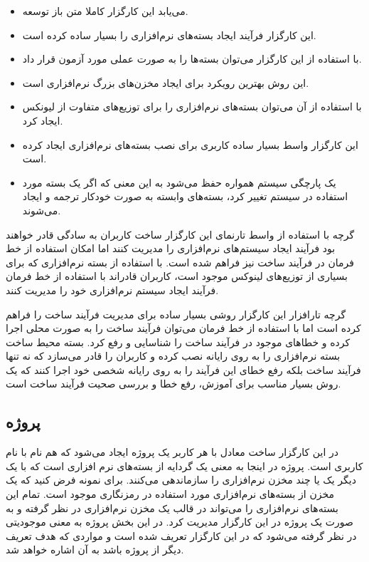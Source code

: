 \begin{itemize}
  \item می‌یابد این کارگزار کاملا متن باز توسعه.
  \item این کارگزار فرآیند ایجاد بسته‌های نرم‌افزاری را بسیار ساده کرده است.
  \item با استفاده از این کارگزار می‌توان بسته‌ها را به صورت عملی مورد آزمون
  قرار داد.
  \item این روش بهترین رویکرد برای ایجاد مخزن‌های بزرگ نرم‌افزاری است.
  \item با استفاده از آن می‌توان بسته‌های نرم‌افزاری را برای توزیع‌های متفاوت از
  لیونکس ایجاد کرد.
  \item این کارگزار واسط بسیار ساده کاربری برای نصب بسته‌های نرم‌افزاری ایجاد
  کرده است.
  \item یک پارچگی سیستم همواره حفظ می‌شود به این معنی که اگر یک بسته مورد
  استفاده در سیستم تغییر کرد، بسته‌های وابسته به صورت خودکار ترجمه و ایجاد
  می‌شوند.
\end{itemize}

گرچه با استفاده از واسط تارنمای این کارگزار ساخت کاربران به سادگی قادر خواهند
بود فرآیند ایجاد سیستم‌های نرم‌افزاری را مدیریت کنند اما امکان استفاده از خط
فرمان در فرآیند ساخت نیز فراهم شده است. با استفاده از بسته نرم‌افزاری 
که برای بسیاری از توزیع‌های لینوکس موجود است، کاربران قادراند با استفاده از خط
فرمان فرآیند ایجاد سیستم نرم‌افزاری خود را مدیریت کنند.

گرچه تارافزار این کارگزار روشی بسیار ساده برای مدیریت فرآیند ساخت را فراهم کرده
است اما با استفاده از خط فرمان می‌توان فرآیند ساخت را به صورت محلی اجرا کرده و
خطاهای موجود در فرآیند ساخت را شناسایی و رفع کرد. بسته  محیط ساخت
بسته نرم‌افزاری را به روی رایانه نصب کرده و کاربران را قادر می‌سازد که نه تنها
فرآیند ساخت بلکه رفع خطای این فرآیند را به روی رایانه شخصی خود اجرا کنند که یک
روش بسیار مناسب برای آموزش، رفع خطا و بررسی صحیت فرآیند ساخت است.

\subsection{پروژه}

در این کارگزار ساخت معادل با هر کاربر یک پروژه ایجاد می‌شود که هم نام با نام
کاربری است. پروژه در اینجا به معنی یک گردایه از بسته‌های نرم افزاری است که با یک
دیگر یک یا چند مخزن نرم‌افزاری را سازماندهی می‌کنند. برای نمونه فرض کنید که یک
مخزن از بسته‌های نرم‌افزاری مورد استفاده در رمزنگاری موجود است. تمام این
بسته‌های نرم‌افزاری را می‌تواند در قالب یک مخزن نرم‌افزاری در نظر گرفته و به
صورت یک پروژه در این کارگزار مدیریت کرد. در این بخش پروژه به معنی موجودیتی در
نظر گرفته می‌شود که در این کارگزار تعریف شده است و مواردی که هدف تعریف دیگر از
پروژه باشد به آن اشاره خواهد شد.

